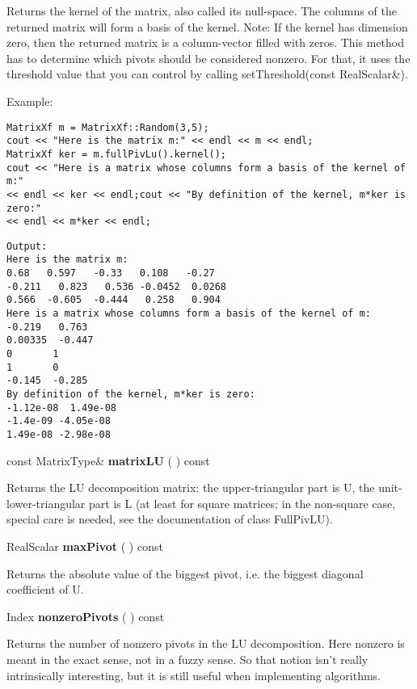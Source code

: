 Returns the kernel of the matrix, also called its null-space. The columns of the returned matrix will form a basis of the kernel.
Note: If the kernel has dimension zero, then the returned matrix is a column-vector filled with zeros.
This method has to determine which pivots should be considered nonzero. For that, it uses the threshold value that you can control by calling setThreshold(const RealScalar\&).


Example:

\begin{lstlisting}
MatrixXf m = MatrixXf::Random(3,5);
cout << "Here is the matrix m:" << endl << m << endl;
MatrixXf ker = m.fullPivLu().kernel();
cout << "Here is a matrix whose columns form a basis of the kernel of m:"     
<< endl << ker << endl;cout << "By definition of the kernel, m*ker is zero:"     
<< endl << m*ker << endl;
\end{lstlisting}

\begin{verbatim}		
Output:
Here is the matrix m:
0.68   0.597   -0.33   0.108   -0.27
-0.211   0.823   0.536 -0.0452  0.0268
0.566  -0.605  -0.444   0.258   0.904
Here is a matrix whose columns form a basis of the kernel of m:
-0.219   0.763
0.00335  -0.447
0       1
1       0
-0.145  -0.285
By definition of the kernel, m*ker is zero:
-1.12e-08  1.49e-08
-1.4e-09 -4.05e-08
1.49e-08 -2.98e-08
\end{verbatim}


\vspace{0.3cm}
const MatrixType\& \textbf{matrixLU}  ( )  const 

Returns the LU decomposition matrix: the upper-triangular part is U, the unit-lower-triangular part is L (at least for square matrices; in the non-square case, special care is needed, see the documentation of class FullPivLU).


\vspace{0.3cm}
RealScalar \textbf{maxPivot}  ( )  const 

Returns the absolute value of the biggest pivot, i.e. the biggest diagonal coefficient of U. 


\vspace{0.3cm}
Index \textbf{nonzeroPivots}  ( )  const 

Returns the number of nonzero pivots in the LU decomposition. Here nonzero is meant in the exact sense, not in a fuzzy sense. So that notion isn't really intrinsically interesting, but it is still useful when implementing algorithms.


